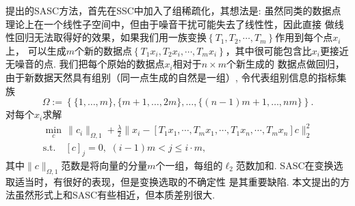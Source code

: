 \cite{yuan2014sparse}提出的SASC方法，首先在SSC中加入了组稀疏化，其想法是:
虽然同类的数据点理论上在一个线性子空间中，但由于噪音干扰可能失去了线性性，因此直接
做线性回归无法取得好的效果，如果我们用一族变换\(\left\{ 
T_1, T_2, \cdots, T_m\right\}\)作用到每个点\(x_i\)上，
可以生成\(m\)个新的数据点\(\left\{ T_1 x_i, T_2 x_i,\cdots,
T_m x_i \right\}\)，其中很可能包含比\(x_i\)更接近无噪音的点. 
我们把每个原始的数据点\(x_i\)相对于\(n\times m\)个新生成的
数据点做回归，由于新数据天然具有组别（同一点生成的自然是一组）,
令代表组别信息的指标集族
\begin{equation*}
  \Omega:= \left\{ \{1,\ldots, m\}, \{m+1, \ldots, 2m\}, \ldots, \{(n-1)m+1,
  \ldots, nm\}\right\}.
\end{equation*}
对每个\(x_i\)求解
\begin{equation}
  \begin{gathered}
    \min_{c}\, \|c_i\|_{\Omega, 1}+\frac{\lambda}{2}\|x_i-\left[ 
      T_1 x_1, \cdots, T_m x_1,\cdots, T_1 x_n, \cdots, T_m x_n
    \right] c\|_2^2 \\
    \text{s.t.} \quad [c]_j = 0,\,\, (i-1)m < j \le i\cdot m,
  \end{gathered}
  \label{eq:sasc}
\end{equation}
其中\(\|c\|_{\Omega, 1}\)范数是将向量的分量\(m\)个一组，每组的\(\ell_2\)范数加和.
SASC在变换选取适当时，有很好的表现，但是变换选取的不确定性
是其重要缺陷. 本文提出的方法虽然形式上和SASC有些相近，但本质差别很大.
